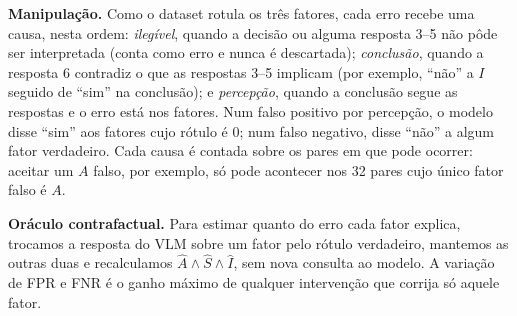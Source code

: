 \documentclass[conference]{IEEEtran}
\begin{document}
\textbf{Manipulação.} Como o dataset rotula os três fatores, cada erro recebe uma causa, nesta ordem:
\emph{ilegível}, quando a decisão ou alguma resposta 3--5 não pôde ser interpretada (conta como erro e
nunca é descartada); \emph{conclusão}, quando a resposta 6 contradiz o que as respostas 3--5 implicam
(por exemplo, ``não'' a $I$ seguido de ``sim'' na conclusão); e \emph{percepção}, quando a conclusão segue
as respostas e o erro está nos fatores. Num falso positivo por percepção, o modelo disse ``sim'' aos
fatores cujo rótulo é 0; num falso negativo, disse ``não'' a algum fator verdadeiro. Cada causa é contada
sobre os pares em que pode ocorrer: aceitar um $A$ falso, por exemplo, só pode acontecer nos 32 pares
cujo único fator falso é $A$.

\textbf{Oráculo contrafactual.} Para estimar quanto do erro cada fator explica, trocamos a resposta do
VLM sobre um fator pelo rótulo verdadeiro, mantemos as outras duas e recalculamos
$\hat A\wedge\hat S\wedge\hat I$, sem nova consulta ao modelo. A variação de FPR e FNR é o ganho máximo
de qualquer intervenção que corrija só aquele fator.
\end{document}
